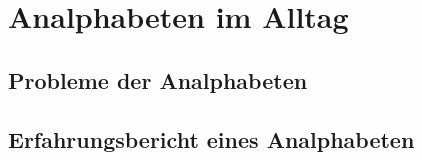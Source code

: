 \section{Analphabeten im Alltag}

	\subsection{Probleme der Analphabeten}	
		
		
		
	\subsection{Erfahrungsbericht eines Analphabeten}
		